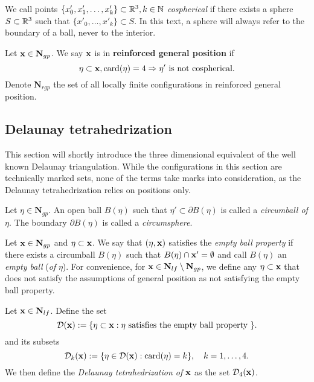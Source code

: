 We call points $\{x'_0,x'_1,\dots,x'_k\}\subset {\mathbb R^3},k \in \mathbb N$ \textit{cospherical} if there exists a sphere $S\subset {\mathbb R^3}$ such that $\{x'_0,\dots, x'_k\} \subset S$. In this text, a sphere will always refer to the boundary of a ball, never to the interior.

\begin{definition}
Let ${\mathbf{x}} \in \mathbf N_{gp}$. We say ${\mathbf{x}}$ is in \textbf{reinforced general position} if 
$$ \eta \subset {\mathbf{x}}, \mathrm{card}(\eta) = 4 \Rightarrow \eta' \text{ is not cospherical.} $$   
Denote $\mathbf N_{rgp}$ the set of all locally finite configurations in reinforced general position.
\end{definition}


\subsection{Delaunay tetrahedrization}
This section will shortly introduce the three dimensional equivalent of the well known Delaunay triangulation. While the configurations in this section are technically marked sets, none of the terms take marks into consideration, as the Delaunay tetrahedrization relies on positions only.



\begin{definition}
	Let $\eta \in \mathbf N_{gp}$. An open ball $B(\eta)$ such that $\eta' \subset \partial B(\eta)$ is called a \textit{circumball of $\eta$}. The boundary $\partial B(\eta)$ is called a \textit{circumsphere}.
\end{definition}	

\begin{definition}
	Let ${\mathbf{x}} \in \mathbf N_{gp}$ and $\eta \subset {\mathbf{x}}$. We say that $(\eta,{\mathbf{x}})$ satisfies the \textit{empty ball property} if there exists a circumball $B(\eta)$ such that $B(\eta) \cap {\mathbf{x}}' = \emptyset$ and call $B(\eta)$ an \textit{empty ball} (\textit{of }$\eta$). 
	For convenience, for ${\mathbf{x}} \in \mathbf N_{lf}\setminus \mathbf N_{gp}$, we define any $\eta\subset {\mathbf{x}}$ that does not satisfy the assumptions of general position as not satisfying the empty ball property.
\end{definition}


\begin{definition}\label{def:Delaunay}
	Let ${\mathbf{x}} \in \mathbf N_{lf}$. Define the set 
	$$\mathcal {D}({\mathbf{x}}) := \{\eta\subset {\mathbf{x}}: \eta \text{ satisfies the empty ball property }\}.$$
	and its subsets
	$$\mathcal {D}_k({\mathbf{x}}) := \{\eta \in \mathcal {D}({\mathbf{x}}): \mathrm{card}(\eta)=k \},\quad k = 1,\dots,4.$$
	We then define the \textit{Delaunay tetrahedrization of ${\mathbf{x}}$} as the set $\mathcal D_4({\mathbf{x}})$. 
\end{definition}

